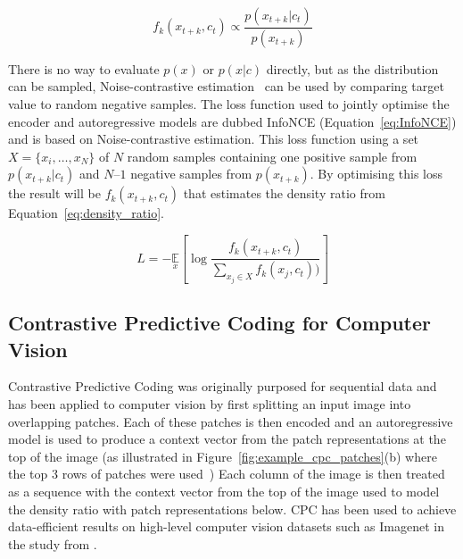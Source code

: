 \begin{equation}
	f_k(x_{t+k}, c_t) \propto \frac{p(x_{t+k}|c_t)}{p(x_{t+k})}
	\label{eq:density_ratio}
\end{equation}

There is no way to evaluate $p(x)$ or $p(x|c)$ directly, but as the distribution can be sampled, Noise-contrastive estimation~\citep{gutmann2010noise} can be used by comparing target value to random negative samples. The loss function used to jointly optimise the encoder and autoregressive models are dubbed InfoNCE (Equation~\ref{eq:InfoNCE}) and is based on Noise-contrastive estimation. This loss function using a set $X=\{x_i,…,x_N\}$ of $N$ random samples containing one positive sample from $p(x_{t+k}|c_t)$ and $N – 1$ negative samples from $p(x_{t+k})$. By optimising this loss the result will be $f_k(x_{t+k}, c_t)$ that estimates the density ratio from Equation~\ref{eq:density_ratio}.

\begin{equation}
	L=-\underset{x}{\mathbb{E}}\left[\log\frac{f_k(x_{t+k},c_t)}{\sum_{x_j\in X}f_k(x_j,c_t))}\right]
	\label{eq:InfoNCE}
\end{equation} 

\subsection{Contrastive Predictive Coding for Computer Vision}
\label{subsec:unsupervised_cpc_for_vision}
Contrastive Predictive Coding was originally purposed for sequential data and has been applied to computer vision by first splitting an input image into overlapping patches. Each of these patches is then encoded and an autoregressive model is used to produce a context vector from the patch representations at the top of the image (as illustrated in Figure~\ref{fig:example_cpc_patches}(b) where the top 3 rows of patches were used~\citep{oord2018representation}) Each column of the image is then treated as a sequence with the context vector from the top of the image used to model the density ratio with patch representations below. CPC has been used to achieve data-efficient results on high-level computer vision datasets such as Imagenet in the study from \cite{deng2009imagenet}.

